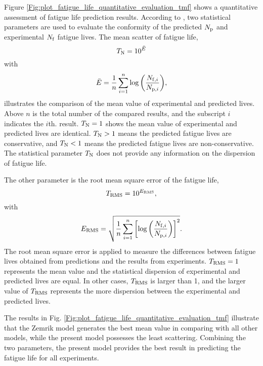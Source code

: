 \documentclass[preprint,5p,twocolumn,11pt,sort&compress]{elsarticle}
\begin{document}
{Figure \ref{Fig:plot_fatigue_life_quantitative_evaluation_tmf} shows a quantitative assessment of fatigue life prediction results. According to \cite{KAROLCZUK201439,WALAT201473,SKIBICKI201718}, two statistical parameters are used to evaluate the conformity of the predicted $N_{\rm p}$ and experimental $N_{\rm f}$ fatigue lives. The mean scatter of fatigue life,}
\begin{equation}
{T_{\rm N}} = {10^{\bar E}}
\end{equation}
with
\begin{equation}
\bar E = \frac{1}{n}\sum\limits_{i = 1}^n {\log \left( {\frac{{{N_{{\rm f},i}}}}{{{N_{{\rm p},i}}}}} \right)},
\end{equation}
{illustrates the comparison of the mean value of experimental and predicted lives. Above $n$ is the total number of the compared results, and the subscript $i$ indicates the $i$th. result. $T_{\rm N} = 1$ shows the mean value of experimental and predicted lives are identical. $T_{\rm N} > 1$ means the predicted fatigue lives are conservative, and $T_{\rm N} < 1$ means the predicted fatigue lives are non-conservative. The statistical parameter $T_{\rm N}$ does not provide any information on the dispersion of fatigue life.}

The other parameter is the root mean square error of the fatigue life,
\begin{equation}
{T_{\rm RMS}} = {10^{{E_{\rm RMS}}}},
\end{equation}
with
\begin{equation}
{E_{\rm RMS}} = \sqrt {\frac{1}{n}\sum\limits_{i = 1}^n {\left[{{\log }}\left( {\frac{{{N_{{\rm f},i}}}}{{{N_{{\rm p},i}}}}} \right) \right]^2}}.
\end{equation}
{The root mean square error is applied to measure the differences between fatigue lives obtained from predictions and the results from experiments. $T_{\rm RMS} = 1$ represents the mean value and the statistical dispersion of experimental and predicted lives are equal. In other cases, $T_{\rm RMS}$ is larger than 1, and the larger value of $T_{\rm RMS}$ represents the more dispersion between the experimental and predicted lives.}

The results in Fig. \ref{Fig:plot_fatigue_life_quantitative_evaluation_tmf} illustrate that the Zemrik model generates the best mean value in comparing with all other models, while the present model possesses the least scattering. Combining the two parameters, the present model provides the best result in predicting the fatigue life for all experiments.
\end{document}
